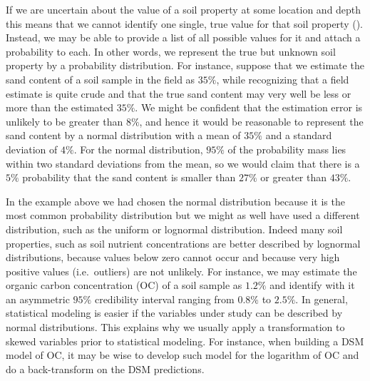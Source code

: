 \documentclass[10pt,b5paper,]{book}
\theoremstyle{definition}
\theoremstyle{definition}
\theoremstyle{definition}
\theoremstyle{remark}
\begin{document}
If we are uncertain about the value of a soil property at some location
and depth this means that we cannot identify one single, true value for
that soil property
(\cite{goovaerts2001geostatistical, arrouays_uncertainty_2014}).
Instead, we may be able to provide a list of all possible values for it
and attach a probability to each. In other words, we represent the true
but unknown soil property by a probability distribution. For instance,
suppose that we estimate the sand content of a soil sample in the field
as \(35\%\), while recognizing that a field estimate is quite crude and
that the true sand content may very well be less or more than the
estimated \(35\%\). We might be confident that the estimation error is
unlikely to be greater than \(8\%\), and hence it would be reasonable to
represent the sand content by a normal distribution with a mean of
\(35\%\) and a standard deviation of \(4\%\). For the normal
distribution, \(95\%\) of the probability mass lies within two standard
deviations from the mean, so we would claim that there is a \(5\%\)
probability that the sand content is smaller than \(27\%\) or greater
than \(43\%\).

In the example above we had chosen the normal distribution because it is
the most common probability distribution but we might as well have used
a different distribution, such as the uniform or lognormal distribution.
Indeed many soil properties, such as soil nutrient concentrations are
better described by lognormal distributions, because values below zero
cannot occur and because very high positive values (i.e.~outliers) are
not unlikely. For instance, we may estimate the organic carbon
concentration (OC) of a soil sample as \(1.2\%\) and identify with it an
asymmetric \(95\%\) credibility interval ranging from \(0.8\%\) to
\(2.5\%\). In general, statistical modeling is easier if the variables
under study can be described by normal distributions. This explains why
we usually apply a transformation to skewed variables prior to
statistical modeling. For instance, when building a DSM model of OC, it
may be wise to develop such model for the logarithm of OC and do a
back-transform on the DSM predictions.
\end{document}
